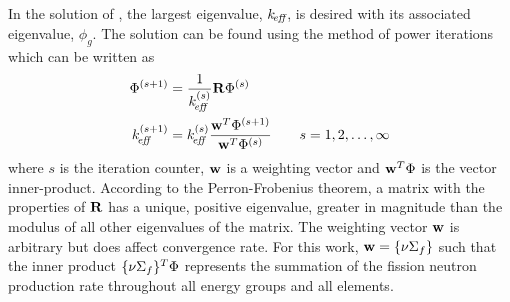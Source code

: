     In the solution of , the largest eigenvalue,
    $k_{\!\mbox{\scriptsize \em eff}}$, is desired with its associated eigenvalue, $\phi_g$. The solution 
    can be found using the method of power iterations which can be written as 
    \begin{align}
      \label{eq:power_iteration_phi}
      \Phi^{(s+1)} &= \frac{1}{k_{\!\mbox{\scriptsize \em eff}}^{(s)}} \mathbf{R} \Phi^{(s)} \\
      \label{eq:power_iteration_eigenvalue}
      k_{\!\mbox{\scriptsize \em eff}}^{(s+1)} &= k_{\!\mbox{\scriptsize \em eff}}^{(s)} \frac{\mathbf{w}^{T} \Phi^{(s+1)}}
        {\mathbf{w}^{T} \Phi^{(s)}} \qquad s = 1,2,\ldots,\infty
    \end{align}
    where $s$ is the iteration counter, $\mathbf{w}$ is a weighting vector and 
    $\mathbf{w}^{T} \Phi$ is the vector inner-product. According to the 
    Perron-Frobenius theorem, a matrix with the properties of $\mathbf{R}$ has a 
    unique, positive eigenvalue, greater in magnitude than the modulus of all 
    other eigenvalues of the matrix. The weighting vector $\mathbf{w}$ is arbitrary 
    but does affect convergence rate. For this work,
    $\mathbf{w} = \{\nu \Sigma_f\}$ such that the inner product 
    $\{\nu \Sigma_f\}^T \Phi$ represents the summation of the fission neutron
    production rate throughout all energy groups and all elements. 
    

